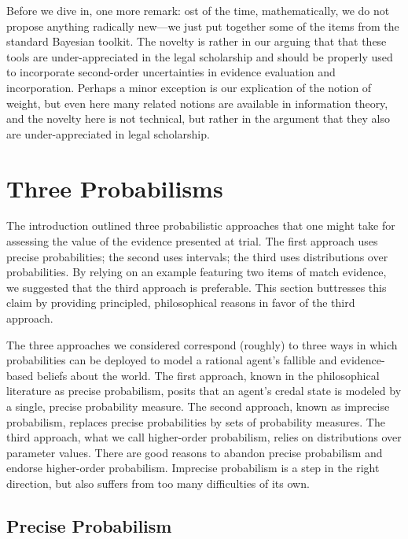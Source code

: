 \documentclass[
  10pt,
  dvipsnames,enabledeprecatedfontcommands]{scrartcl}
\begin{document}
Before we dive in, one more remark: ost of the time, mathematically, we
do not propose anything radically new---we just put together some of the
items from the standard Bayesian toolkit. The novelty is rather in our
arguing that that these tools are under-appreciated in the legal
scholarship and should be properly used to incorporate second-order
uncertainties in evidence evaluation and incorporation. Perhaps a minor
exception is our explication of the notion of weight, but even here many
related notions are available in information theory, and the novelty
here is not technical, but rather in the argument that they also are
under-appreciated in legal scholarship.

\hypertarget{three-probabilisms}{%
\section{Three Probabilisms}\label{three-probabilisms}}

\label{sec:three-probabilism}

The introduction outlined three probabilistic approaches that one might
take for assessing the value of the evidence presented at trial. The
first approach uses precise probabilities; the second uses intervals;
the third uses distributions over probabilities. By relying on an
example featuring two items of match evidence, we suggested that the
third approach is preferable. This section buttresses this claim by
providing principled, philosophical reasons in favor of the third
approach.

The three approaches we considered correspond (roughly) to three ways in
which probabilities can be deployed to model a rational agent's fallible
and evidence-based beliefs about the world. The first approach, known in
the philosophical literature as precise probabilism, posits that an
agent's credal state is modeled by a single, precise probability
measure. The second approach, known as imprecise probabilism, replaces
precise probabilities by sets of probability measures. The third
approach, what we call higher-order probabilism, relies on distributions
over parameter values. There are good reasons to abandon precise
probabilism and endorse higher-order probabilism. Imprecise probabilism
is a step in the right direction, but also suffers from too many
difficulties of its own.

\hypertarget{precise-probabilism}{%
\subsection{Precise Probabilism}\label{precise-probabilism}}
\end{document}
